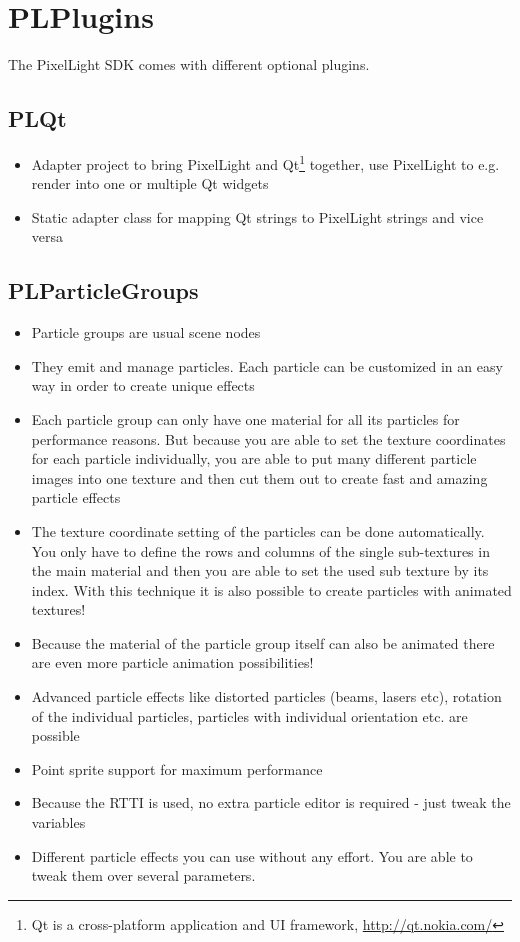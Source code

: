 \chapter{PLPlugins}
The PixelLight SDK comes with different optional plugins.




\section{PLQt}
\begin{itemize}
\item{Adapter project to bring PixelLight and Qt\footnote{Qt is a cross-platform application and UI framework, \url{http://qt.nokia.com/}} together, use PixelLight to e.g. render into one or multiple Qt widgets}
\item{Static adapter class for mapping Qt strings to PixelLight strings and vice versa}
\end{itemize}




\section{PLParticleGroups}
\begin{itemize}
\item{Particle groups are usual scene nodes}
\item{They emit and manage particles. Each particle can be customized in an easy way in order to create unique effects}
\item{Each particle group can only have one material for all its particles for performance reasons. But because you are able to set the texture coordinates for each particle individually, you are able to put many different particle images into one texture and then cut them out to create fast and amazing particle effects}
\item{The texture coordinate setting of the particles can be done automatically. You only have to define the rows and columns of the single sub-textures in the main material and then you are able to set the used sub texture by its index. With this technique it is also possible to create particles with animated textures!}
\item{Because the material of the particle group itself can also be animated there are even more particle animation possibilities!}
\item{Advanced particle effects like distorted particles (beams, lasers etc), rotation of the individual particles, particles with individual orientation etc. are possible}
\item{Point sprite support for maximum performance}
\item{Because the RTTI is used, no extra particle editor is required - just tweak the variables}
\item{Different particle effects you can use without any effort. You are able to tweak them over several parameters.}
\end{itemize}




